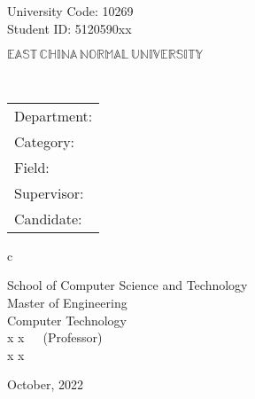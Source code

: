 \newpage

\pagestyle{empty}

\newline
\hspace*{\fill} {University Code: 10269}\\
\hspace*{\fill} {Student ID: 
5120590xx
}%

\vskip 2cm

\begin{center}
    {\Huge $\mathbb{EAST}\,\mathbb{CHINA}\,\mathbb{NORMAL}\,
            \mathbb{UNIVERSITY}$}
\end{center}

\vskip 3cm

\begin{center}
    \bfseries{\scshape{\huge \thesisETitle}}\\
\end{center}

\vskip 2cm {\large
        \begin{center}
            \begin{tabular}{l}
                Department:         \\
                Category:              \\
                Field: \\
                Supervisor:         \\
                Candidate:
            \end{tabular}
            \begin{tabular}c

                School of Computer Science and Technology\\
                \hline Master of Engineering\\
                \hline Computer Technology\\
                \hline x x~~~(Professor)\\
                \hline x x\\


                \hline
            \end{tabular}
        \end{center}}

\vskip 30mm

\begin{center}
    {\Large October, 2022}
\end{center}
